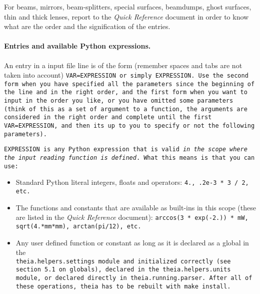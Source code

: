 \documentclass{article}
\begin{document}
For beams, mirrors, beam-splitters, special surfaces, beamdumps, ghost surfaces, thin and thick lenses, report to the \textit{Quick Reference} document in order to know what are the order and the signification of the entries.

\paragraph{Entries and available Python expressions.}An entry in a input file line is of the form (remember spaces and tabs are not taken into account) \tt{VAR=EXPRESSION} or simply \tt{EXPRESSION}. Use the second form when you have specified all the parameters since the beginning of the line and in the right order, and the first form when you want to input in the order you like, or you have omitted some parameters (think of this as a set of argument to a function, the arguments are considered in the right order and complete until the first \tt{VAR=EXPRESSION}, and then its up to you to specify or not the following parameters).

\tt{EXPRESSION} is any Python expression that is valid \textit{in the scope where the input reading function is defined}. What this means is that you can use:
\begin{itemize}
\item Standard Python literal integers, floats and operators: \tt{4.}, \tt{.2e-3 * 3 / 2}, etc.
\item The functions and constants that are available as built-ins in this scope (these are listed in the \textit{Quick Reference} document): \tt{arccos(3 * exp(-2.)) * mW}, \tt{sqrt(4.*mm*mm)}, \tt{arctan(pi/12)}, etc.
\item Any user defined function or constant as long as it is declared as a global in the \\ \tt{theia.helpers.settings} module and initialized correctly (see section 5.1 on globals), declared in the \tt{theia.helpers.units} module, or declared directly in \tt{theia.running.parser}. After all of these operations, \tt{theia} has to be rebuilt with \tt{make install}.
\end{itemize}




\end{document}
